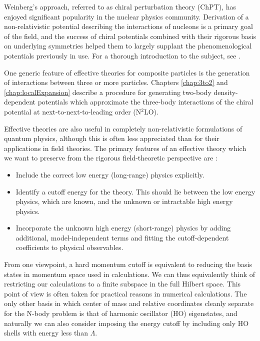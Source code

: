 Weinberg's approach, referred to as chiral perturbation theory (ChPT), has enjoyed significant popularity in the nuclear physics community. Derivation of a non-relativistic potential describing the interactions of nucleons is a primary goal of the field, and the success of chiral potentials combined with their rigorous basis on underlying symmetries helped them to largely supplant the phenomenological potentials previously in use. For a thorough introduction to the subject, see \cite{Machleidt20111}.

One generic feature of effective theories for composite particles is the generation of interactions between three or more particles. Chapters \ref{chap:3to2} and \ref{chap:localExpansion} describe a procedure for generating two-body density-dependent potentials which approximate the three-body interactions of the chiral potential at next-to-next-to-leading order (N$^2$LO).

Effective theories are also useful in completely non-relativistic formulations of quantum physics, although this is often less appreciated than for their applications in field theories. The primary features of an effective theory which we want to preserve from the rigorous field-theoretic perspective are \cite{Lepage:1997}:
\begin{itemize}
\item Include the correct low energy (long-range) physics explicitly. 
\item Identify a cutoff energy for the theory. This should lie between the low energy physics, which are known, and the unknown or intractable high energy physics. 
\item Incorporate the unknown high energy (short-range) physics by adding additional, model-independent terms and fitting the cutoff-dependent coefficients to physical observables.
\end{itemize}

From one viewpoint, a hard momentum cutoff is equivalent to reducing the basis states in momentum space used in calculations. We can thus equivalently think of restricting our calculations to a finite subspace in the full Hilbert space. This point of view is often taken for practical reasons in numerical calculations. The only other basis in which center of mass and relative coordinates cleanly separate for the N-body problem is that of harmonic oscillator (HO) eigenstates, and naturally we can also consider imposing the energy cutoff by including only HO shells with energy less than $\Lambda$. 

